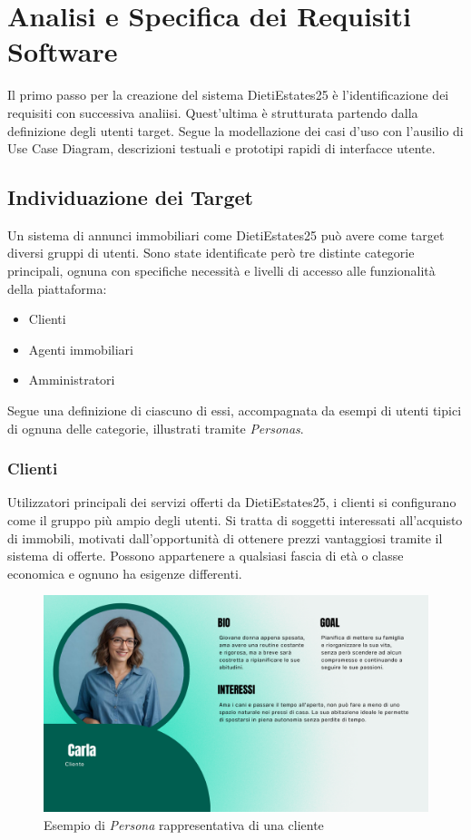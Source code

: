 \documentclass{book}
\begin{document}
\chapter{Analisi e Specifica dei Requisiti Software}

Il primo passo per la creazione del sistema DietiEstates25 è l'identificazione dei requisiti con successiva analiisi. Quest'ultima è strutturata partendo dalla definizione degli utenti target. Segue la modellazione dei casi d'uso con l'ausilio di Use Case Diagram, descrizioni testuali e prototipi rapidi di interfacce utente.

\section{Individuazione dei Target}

Un sistema di annunci immobiliari come DietiEstates25 può avere come target diversi gruppi di utenti. Sono state identificate però tre distinte categorie principali, ognuna con specifiche necessità e livelli di accesso alle funzionalità della piattaforma:
\begin{itemize}
    \item Clienti
    \item Agenti immobiliari
    \item Amministratori
\end{itemize}
Segue una definizione di ciascuno di essi, accompagnata da esempi di utenti tipici di ognuna delle categorie, illustrati tramite \textit{Personas}.

\subsection{Clienti}
Utilizzatori principali dei servizi offerti da DietiEstates25, i clienti si configurano come il gruppo più ampio degli utenti. Si tratta di soggetti interessati all'acquisto di immobili, motivati dall'opportunità di ottenere prezzi vantaggiosi tramite il sistema di offerte. Possono appartenere a qualsiasi fascia di età o classe economica e ognuno ha esigenze differenti.

\begin{figure}[!htb]
    \includegraphics[width=\textwidth]{figures/youngclientPersona.pdf}
    \centering
    \caption{Esempio di \textit{Persona} rappresentativa di una cliente}
\end{figure}
\end{document}
